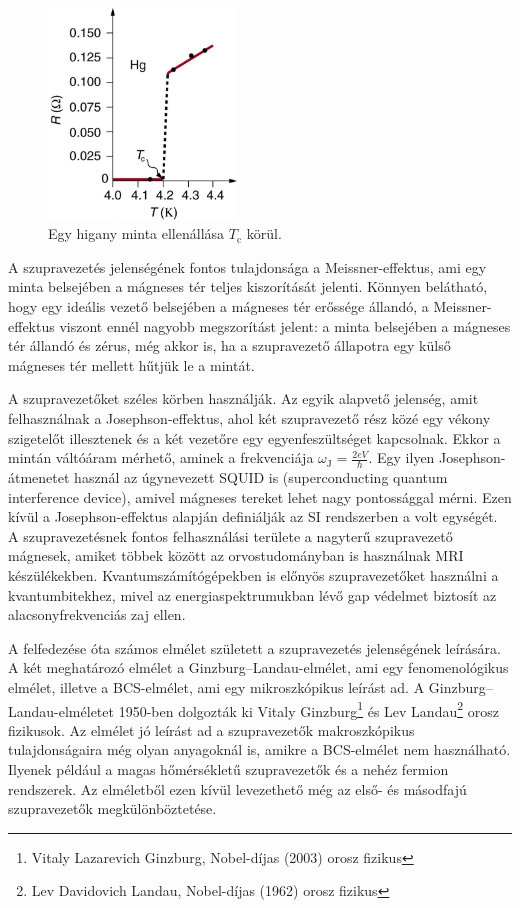 \documentclass[a4paper,12pt,titlepage]{article}
\begin{document}
\begin{figure}[h!]
	\centering
	\includegraphics[width=5cm]{higany_R-vs-T.jpg}
	\caption{Egy higany minta ellenállása $T_\text{c}$ körül. \cite{openstax}}
\end{figure}

A szupravezetés jelenségének fontos tulajdonsága a Meissner-effektus, ami egy minta belsejében a mágneses tér teljes kiszorítását jelenti.  Könnyen belátható, hogy egy ideális vezető belsejében a mágneses tér erőssége állandó, a Meissner-effektus viszont ennél nagyobb megszorítást jelent: a minta belsejében a mágneses tér állandó és zérus, még akkor is, ha a szupravezető állapotra egy külső mágneses tér mellett hűtjük le a mintát.

A szupravezetőket széles körben használják.  Az egyik alapvető jelenség, amit felhasználnak a Josephson-effektus, ahol két szupravezető rész közé egy vékony szigetelőt illesztenek és a két vezetőre egy egyenfeszültséget kapcsolnak.  Ekkor a mintán váltóáram mérhető, aminek a frekvenciája $\omega_\text{J} = \frac{2e V}{\hbar}$.  Egy ilyen Josephson-átmenetet használ az úgynevezett SQUID is (superconducting quantum interference device), amivel mágneses tereket lehet nagy pontossággal mérni.  Ezen kívül a Josephson-effektus alapján definiálják az SI rendszerben a volt egységét.  A szupravezetésnek fontos felhasználási területe a nagyterű szupravezető mágnesek, amiket többek között az orvostudományban is használnak MRI készülékekben.  Kvantumszámítógépekben is előnyös szupravezetőket használni a kvantumbitekhez, mivel az energiaspektrumukban lévő gap védelmet biztosít az alacsonyfrekvenciás zaj ellen.

A felfedezése óta számos elmélet született a szupravezetés jelenségének leírására.  A két meghatározó elmélet a Ginzburg--Landau-elmélet, ami egy fenomenológikus elmélet, illetve a BCS-elmélet, ami egy mikroszkópikus leírást ad.
A Ginzburg--Landau-elméletet 1950-ben dolgozták ki Vitaly Ginzburg\footnote{Vitaly Lazarevich Ginzburg, Nobel-díjas (2003) orosz fizikus} és Lev Landau\footnote{Lev Davidovich Landau, Nobel-díjas (1962) orosz fizikus} orosz fizikusok.  Az elmélet jó leírást ad a szupravezetők makroszkópikus tulajdonságaira még olyan anyagoknál is, amikre a BCS-elmélet nem használható.  Ilyenek például a magas hőmérsékletű szupravezetők és a nehéz fermion rendszerek.  Az elméletből ezen kívül levezethető még az első- és másodfajú szupravezetők megkülönböztetése.
\end{document}
